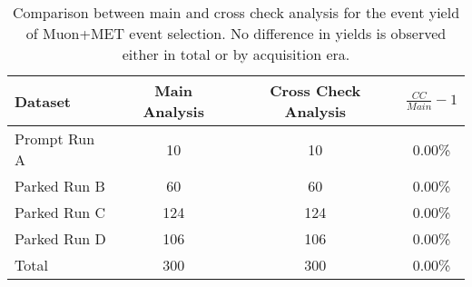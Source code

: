 \begin{table}[!htp]
\centering

\begin{tabular}{|l|c|c||c|}
  \hline
  Dataset & Main Analysis & Cross Check Analysis & $\frac{CC}{Main}-1$ \\ 
  \hline \hline
  Prompt Run A &  10 &  10 & 0.00\% \\
  Parked Run B &  60 &  60 & 0.00\% \\
  Parked Run C & 124 & 124 & 0.00\% \\
  Parked Run D & 106 & 106 & 0.00\% \\
  \hline \hline
  Total & 300 & 300 & 0.00\% \\
  \hline
\end{tabular}

\caption{Comparison between main and cross check analysis for the event yield of Muon+MET event selection. No difference in yields is observed either in total or by acquisition era.}
\end{table}